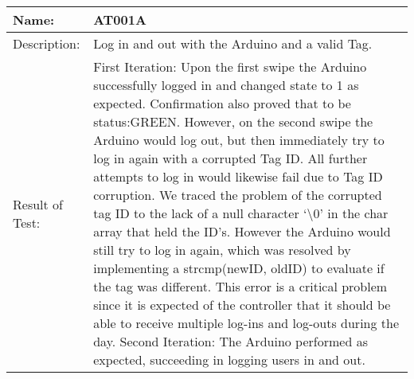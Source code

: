 \begin{table}[h]
	\centering
		\begin{tabular}{|l|p{9cm}|}
		\hline
		\hline
		Name: & AT001A\\
		\hline
		Description: & Log in and out with the Arduino and a valid Tag.\\
		\hline
		Result of Test: & First Iteration: Upon the first swipe the Arduino successfully logged in and changed state to 1 as expected. Confirmation also proved that to be status:GREEN. However, on the second swipe the Arduino would log out, but then immediately try to log in again with a corrupted Tag ID. All further attempts to log in would likewise fail due to Tag ID corruption.
		We traced the problem of the corrupted tag ID to the lack of a null character `\textbackslash 0' in the char array that held the ID's. However the Arduino would still try to log in again, which was resolved by implementing a strcmp(newID, oldID) to evaluate if the tag was different. This error is a critical problem since it is expected of the controller that it should be able to receive multiple log-ins and log-outs during the day.
	Second Iteration: The Arduino performed as expected, succeeding in logging users in and out.  \\
		\hline
		\end{tabular}
\end{table}


